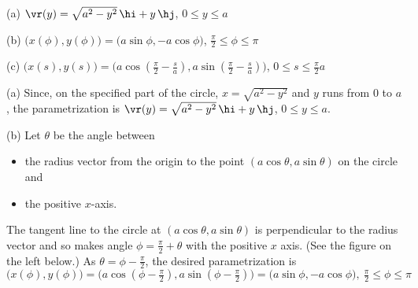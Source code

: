 \begin{answer} 
(a) $\vr(y)=\sqrt{a^2-y^2}\,\hi+ y\,\hj$, $0\le y\le a$

(b) $\big(x(\phi),y(\phi)\big)
       =\big(a\sin \phi ,-a\cos \phi \big)$,
   $\frac{\pi}{2}\le\phi\le\pi$

(c) $\big(x(s),y(s)\big)
    =\big(a\cos(\tfrac{\pi}{2}-\frac{s}{a}),
           a\sin(\tfrac{\pi}{2}-\tfrac{s}{a})\big)$,
   $0\le s\le\tfrac{\pi}{2}a$
\end{answer}

\begin{solution} 
(a) 
Since, on the specified part of the  circle, 
$x=\sqrt{a^2-y^2}$ and  $y$ runs from $0$ to $a$, 
the parametrization is
$\vr(y)=\sqrt{a^2-y^2}\,\hi+ y\,\hj$, $0\le y\le a$.

(b) Let $\theta$ be the angle between 
\begin{itemize}\itemsep1pt \parskip0pt 
\item the radius vector from the origin to the point 
$(a\cos\theta,a\sin\theta)$  on the circle and 
\item
the positive $x$-axis. 
\end{itemize}
The tangent line to the circle at $(a\cos\theta,a\sin\theta)$ 
is perpendicular to the radius vector and so makes angle $\phi=\frac{\pi}{2}+\theta$ with the positive $x$ axis.
(See the figure on the left below.)
As $\theta =\phi-\frac{\pi}{2}$, the desired parametrization is
\begin{equation*}
\big(x(\phi),y(\phi)\big)
=\big(a\cos(\phi-\tfrac{\pi}{2}),a\sin(\phi-\tfrac{\pi}{2})\big)
=\big(a\sin \phi ,-a\cos \phi \big),\ 
  \tfrac{\pi}{2}\le\phi\le\pi
\end{equation*}


\end{solution}

